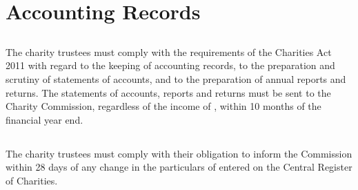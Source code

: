 \section{Accounting Records}\label{sec:accounts}

    \subsection{}
    The charity trustees must comply with the requirements of the Charities Act 2011 with regard to the keeping of accounting records, to the preparation and scrutiny of statements of accounts, and to the preparation of annual reports and returns. The statements of accounts, reports and returns must be sent to the Charity Commission, regardless of the income of \shortname{}, within 10 months of the financial year end.

    \subsection{}
    The charity trustees must comply with their obligation to inform the Commission within 28 days of any change in the particulars of \shortname{} entered on the Central Register of Charities.

